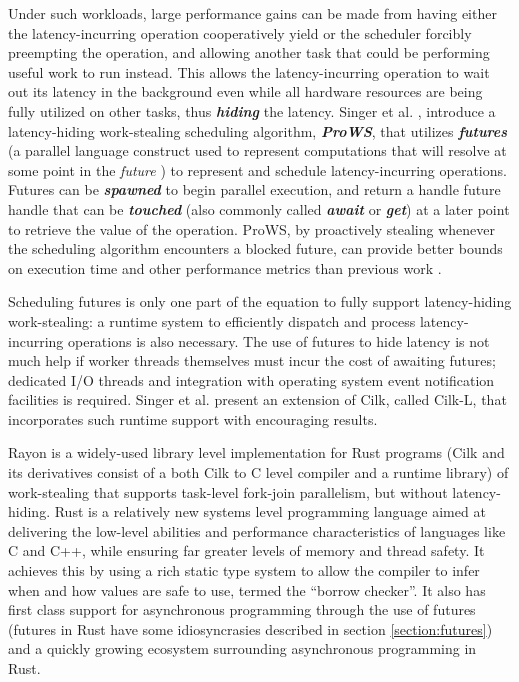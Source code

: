 \documentclass[bsc,frontabs,singlespacing,parskip,deptreport,normalheadings]{infthesis}
\begin{document}
Under such workloads, large performance gains can be made from having either the
latency-incurring operation cooperatively yield or the scheduler forcibly
preempting the operation, and allowing another task that could be performing
useful work to run instead. This allows the latency-incurring operation to wait
out its latency in the background even while all hardware resources are being
fully utilized on other tasks, thus \textbf{\textit{hiding}} the latency. Singer
et al. \cite{singer_proactive_2019}, introduce a latency-hiding work-stealing
scheduling algorithm, \textit{\textbf{ProWS}}, that utilizes
\textbf{\textit{futures}} (a parallel language construct used to represent
computations that will resolve at some point in the \textit{future}
\cite{halstead_implementation_1984, halstead_multilisp_1985}) to represent and
schedule latency-incurring operations. Futures can be \textbf{\textit{spawned}}
to begin parallel execution, and return a handle future handle that can be
\textbf{\textit{touched}} (also commonly called \textbf{\textit{await}} or
\textbf{\textit{get}}) at a later point to retrieve the value of the operation.
ProWS, by proactively stealing whenever the scheduling algorithm encounters a
blocked future, can provide better bounds on execution time and other
performance metrics than previous work \cite{muller_latency-hiding_2016,
spoonhower_beyond_2009}.

Scheduling futures is only one part of the equation to fully support
latency-hiding work-stealing: a runtime system to efficiently dispatch and
process latency-incurring operations is also necessary. The use of futures to
hide latency is not much help if worker threads themselves must incur the cost
of awaiting futures; dedicated I/O threads and integration with operating system
event notification facilities is required. Singer et al.
\cite{singer_scheduling_2019} present an extension of Cilk, called Cilk-L, that
incorporates such runtime support with encouraging results.

Rayon \cite{noauthor_rayon_2022, noauthor_baby_nodate, stone_how_2021} is a
widely-used library level implementation for Rust programs (Cilk and its
derivatives consist of a both Cilk to C level compiler and a runtime library) of
work-stealing that supports task-level fork-join parallelism, but without
latency-hiding. Rust \cite{matsakis_rust_2014} is a relatively new systems level
programming language aimed at delivering the low-level abilities and performance
characteristics of languages like C and C++, while ensuring far greater levels
of memory and thread safety. It achieves this by using a rich static type system
to allow the compiler to infer when and how values are safe to use, termed the
``borrow checker''. It also has first class support for asynchronous programming
through the use of futures (futures in Rust have some idiosyncrasies described
in section \ref{section:futures}) and a quickly growing ecosystem surrounding
asynchronous programming in Rust.
\end{document}
